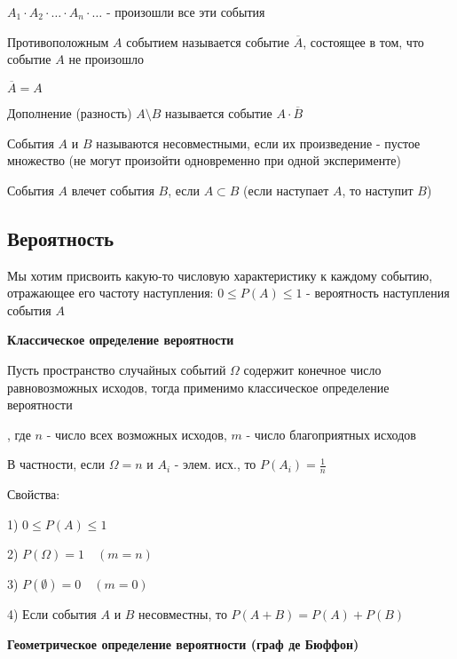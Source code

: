 \documentclass[12pt]{article}
\begin{document}
    $A_1 \cdot A_2 \cdot \dots \cdot A_n \cdot \dots$ - произошли все эти события

     Противоположным $A$ событием называется событие $\overline{A}$, состоящее в том, что событие $A$ не произошло

    \Notas $\overline{A} = A$ %

     Дополнение (разность) $A \setminus B$ называется событие $A \cdot \overline{B}$

     События $A$ и $B$ называются несовместными, если их произведение - пустое множество
    (не могут произойти одновременно при одной эксперименте)

     События $A$ влечет события $B$, если $A \subset B$ (если наступает $A$, то наступит $B$)

    \subsection{Вероятность}

    Мы хотим присвоить какую-то числовую характеристику к каждому событию,
    отражающее его частоту наступления: $0 \leq P(A) \leq 1$ - вероятность наступления события $A$

    \mediumvspace

    \hypertarget{classicdefinitionofprobability}{}

    \textbf{Классическое определение вероятности}

    Пусть пространство случайных событий $\Omega$ содержит конечное число равновозможных исходов,
    тогда применимо классическое определение вероятности

    \Def {}, где $n$ - число всех возможных исходов, $m$ - число благоприятных исходов

    В частности, если $\Omega = n$ и $A_i$ - элем. исх., то $P(A_i) = \frac{1}{n}$

    Свойства:

    1) $0 \leq P(A) \leq 1$

    2) $P(\Omega) = 1 \quad (m = n)$

    3) $P(\emptyset) = 0 \quad (m = 0)$

    4) Если события $A$ и $B$ несовместны, то $P(A + B) = P(A) + P(B)$

    \mediumvspace

    \hypertarget{geometricdefinitionofprobability}{}

    \textbf{Геометрическое определение вероятности (граф де Бюффон)}
\end{document}
